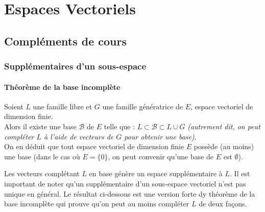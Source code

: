   
\chapter{Espaces Vectoriels}
\minitoc

  \section{Compléments de cours}
 
\subsection{Supplémentaires d'un sous-espace}
\subsubsection{Théorème de la base incomplète}
\begin{theo} 
	Soient \( L \) une famille libre et \( G \) une famille génératrice de \( E \), espace vectoriel de dimension finie. \\
	Alors il existe une base \( \mathcal{B} \) de \( E \) telle que : \( L \subset \mathcal{B} \subset L \cup G \) \textit{(autrement dit, on peut compléter \( L \) à l’aide de vecteurs de \( G \) pour obtenir une base)}. \\
	On en déduit que tout espace vectoriel de dimension finie \( E \) possède (au moins) une base (dans le cas où \( E = \{0\} \), on peut convenir qu’une base de \( E \) est \( \emptyset \)). 
\end{theo}
Les vecteurs complétant $L$ en base génère un espace supplémentaire à $L$.
Il est important de noter qu'un supplémentaire d'un sous-espace vectoriel n'est pas unique en général. Le résultat ci-dessous est une version forte dy théorème de la base incomplète qui prouve qu'on peut au moins compléter $L$ de deux façons.
\vspace{0.5cm}

